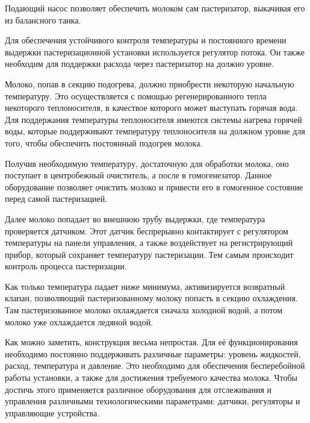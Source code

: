 {  \par \redline Подающий насос позволяет обеспечить молоком сам пастеризатор, выкачивая его из балансного танка.

  \par \redline Для обеспечения устойчивого контроля температуры и постоянного времени выдержки пастеризационной установки используется регулятор потока. Он также необходим для поддержки расхода через пастеризатор на должно уровне.

  \par \redline Молоко, попав в секцию подогрева, должно приобрести некоторую начальную температуру. Это осуществляется с помощью регенерированного тепла некоторого теплоносителя, в качествое которого может выступать горячая вода. Для поддержания температуры теплоносителя имеются системы нагрева горячей воды, которые поддерживают температуру теплоносителя на должном уровне для того, чтобы обеспечить постоянный подогрев молока.

  \par \redline Получив необходимую температуру, достаточную для обработки молока, оно поступает в центробежный очиститель, а после в гомогенезатор. Данное оборудование позволяет очистить молоко и привести его в гомогенное состояние перед самой пастеризацией.

  \par \redline Далее молоко попадает во внешнюю трубу выдержки, где температура проверяется датчиком. Этот датчик беспрерывно контактирует с регулятором температуры на панели управления, а также воздействует на регистрирующий прибор, который сохраняет температуру пастеризации. Тем самым происходит контроль процесса пастеризации.

  \par \redline Как только температура падает ниже минимума, активизируется возвратный клапан, позволяющий пастеризованному молоку попасть в секцию охлаждения. Там пастеризованное молоко охлаждается сначала холодной водой, а потом молоко уже охлаждается ледяной водой.

  \par \redline Как можно заметить, конструкция весьма непростая. Для её функционирования необходимо постоянно поддерживать различные параметры: уровень жидкостей, расход, температура и давление. Это необходимо для обеспечения бесперебойной работы установки, а также для достижения требуемого качества молока. Чтобы достичь этого применяется различное оборудования для отслеживания и управления различными технологическими параметрами: датчики, регуляторы и управляющие устройства.

}
